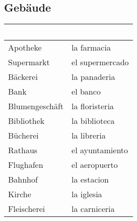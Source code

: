 \documentclass{spanish_summary}
\begin{document}
  \subsection*{Gebäude}
  \begin{longtable}{p{} | p{}} 
    \textbf{~}     & \textbf{~}                                       \\ \hline
    Apotheke & la farmacia\\
    Supermarkt & el supermercado\\
    Bäckerei & la panaderia\\
    Bank & el banco\\
    Blumengeschäft & la floristeria\\    
    Bibliothek & la biblioteca\\
    Bücherei & la libreria\\
    Rathaus & el ayuntamiento\\
    Flughafen & el aeropuerto\\
    Bahnhof & la estacion\\
    Kirche & la iglesia\\
    Fleischerei & la carniceria
  \end{longtable}
  
\end{document}

